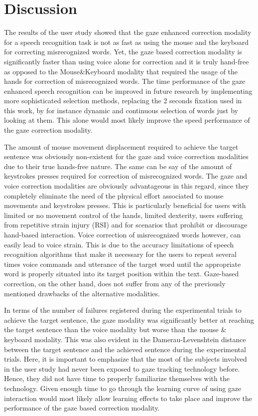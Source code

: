 \documentclass[]{article}
\begin{document}
\section{Discussion}
The results of the user study showed that the gaze enhanced correction modality for a speech recognition task is not as
fast as using the mouse and the keyboard for correcting misrecognized words. Yet, the gaze based correction modality is
significantly faster than using voice alone for correction and it is truly hand-free as opposed to the Mouse\&Keyboard
modality that required the usage of the hands for correction of misrecognized words. The time performance of the gaze enhanced speech
recognition can be improved in future research by implementing more sophisticated selection methods, replacing the 2
seconds fixation used in this work, by for instance dynamic and continuous selection of words just by looking at them. 
This alone would most likely improve the speed performance of the gaze correction modality.


The amount of mouse movement displacement required to achieve the target sentence was obviously non-existent for the
gaze and voice correction modalities due to their true hands-free nature. The same can be say of the amount of
keystrokes presses required for correction of misrecognized words. The gaze and voice correction modalities are
obviously advantageous in this regard, since they completely eliminate the need of the physical effort associated to
mouse movements and keystrokes presses. This is particularly beneficial for users with limited or no movement control of
the hands, limited dexterity, users suffering from repetitive strain injury (RSI) and for scenarios that prohibit or
discourage hand-based interaction. Voice correction of misrecognized words however, can easily lead to voice strain.
This is due to the accuracy limitations of speech recognition algorithms that make it necessary for the users to repeat
several times voice commands and utterance of the target word until the appropriate word is properly situated into its
target position within the text. Gaze-based correction, on the other hand, does not suffer from any of the previously
mentioned drawbacks of the alternative modalities.


In terms of the number of failures registered during the experimental trials to achieve the target sentence, the gaze
modality was significantly better at reaching the target sentence than the voice modality but worse than the mouse \&
keyboard modality. This was also evident in the Damerau-Levenshtein distance between the target sentence and the
achieved sentence during the experimental trials. Here, it is important to emphasize that the most of the subjects
involved in the user study had never been exposed to gaze tracking technology before. Hence, they did not have time to
properly familiarize themselves with the technology. Given enough time to go through the learning curve of using gaze
interaction would most likely allow learning effects to take place and improve the performance of the gaze based
correction modality.
\end{document}
